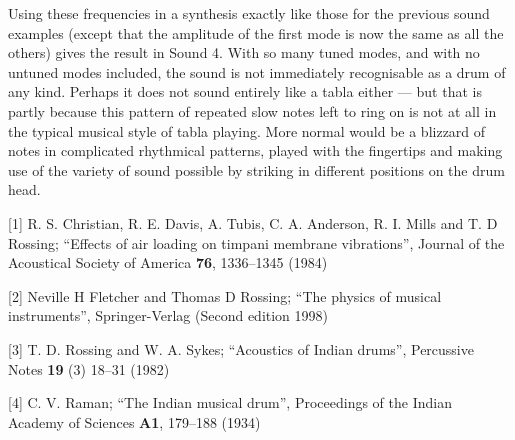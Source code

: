   Using these frequencies in a synthesis exactly like those for the previous 
  sound examples (except that the amplitude of the first mode is now the same 
  as all the others) gives the result in Sound 4. With so many tuned modes, and 
  with no untuned modes included, the sound is not immediately recognisable as 
  a drum of any kind. Perhaps it does not sound entirely like a tabla either 
  --- but that is partly because this pattern of repeated slow notes left to 
  ring on is not at all in the typical musical style of tabla playing. More 
  normal would be a blizzard of notes in complicated rhythmical patterns, 
  played with the fingertips and making use of the variety of sound possible by 
  striking in different positions on the drum head. 

\audio{}



  \sectionreferences{}[1] R. S. Christian, R. E. Davis, A. Tubis, C. A. 
  Anderson, R. I. Mills and T. D Rossing; ``Effects of air loading on timpani 
  membrane vibrations'', Journal of the Acoustical Society of America 
  \textbf{76}, 1336--1345 (1984) 

  [2] Neville H Fletcher and Thomas D Rossing; ``The physics of musical 
  instruments'', Springer-Verlag (Second edition 1998) 

  [3] T. D. Rossing and W. A. Sykes; ``Acoustics of Indian drums'', Percussive 
  Notes \textbf{19} (3) 18--31 (1982) 

  [4] C. V. Raman; ``The Indian musical drum'', Proceedings of the Indian 
  Academy of Sciences \textbf{A1}, 179--188 (1934) 